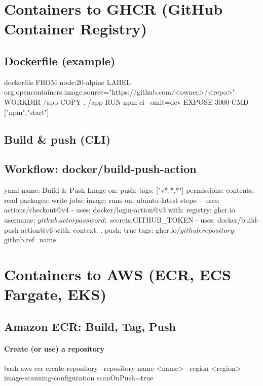 \documentclass[11pt]{article}
\begin{document}
\section{Containers to GHCR (GitHub Container Registry)}
\subsection{Dockerfile (example)}
\begin{code}{dockerfile}
FROM node:20-alpine
LABEL org.opencontainers.image.source="https://github.com/<owner>/<repo>"
WORKDIR /app
COPY . /app
RUN npm ci --omit=dev
EXPOSE 3000
CMD ["npm","start"]
\end{code}

\subsection{Build \& push (CLI)}
\clearpage

\subsection{Workflow: docker/build-push-action}
\begin{code}{yaml}
name: Build & Push Image
on:
  push:
    tags: ["v*.*.*"]
permissions:
  contents: read
  packages: write
jobs:
  image:
    runs-on: ubuntu-latest
    steps:
      - uses: actions/checkout@v4
      - uses: docker/login-action@v3
        with:
          registry: ghcr.io
          username: ${{ github.actor }}
          password: ${{ secrets.GITHUB_TOKEN }}
      - uses: docker/build-push-action@v6
        with:
          context: .
          push: true
          tags: ghcr.io/${{ github.repository }}:${{ github.ref_name }}
\end{code}

\section{Containers to AWS (ECR, ECS Fargate, EKS)}

\subsection{Amazon ECR: Build, Tag, Push}
\paragraph{Create (or use) a repository}
\begin{code}{bash}
aws ecr create-repository --repository-name <name> --region <region> \
  --image-scanning-configuration scanOnPush=true
\end{code}
\end{document}
